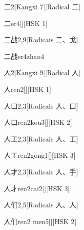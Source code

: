 \begin{entry}{二}{2}[Kangxi 7][Radical ⼆]
  \begin{phonetics}{二}{er4}[][HSK 1]
  \end{phonetics}
\end{entry}

\begin{entry}{二战}{2,9}[Radicais ⼆、⼽]
  \begin{phonetics}{二战}{er4zhan4}
  \end{phonetics}
\end{entry}

\begin{entry}{人}{2}[Kangxi 9][Radical ⼈]
  \begin{phonetics}{人}{ren2}[][HSK 1]
  \end{phonetics}
\end{entry}

\begin{entry}{人口}{2,3}[Radicais ⼈、⼝]
  \begin{phonetics}{人口}{ren2kou3}[][HSK 2]
  \end{phonetics}
\end{entry}

\begin{entry}{人工}{2,3}[Radicais ⼈、⼯]
  \begin{phonetics}{人工}{ren2gong1}[][HSK 3]
  \end{phonetics}
\end{entry}

\begin{entry}{人才}{2,3}[Radicais ⼈、⼿]
  \begin{phonetics}{人才}{ren2cai2}[][HSK 3]
  \end{phonetics}
\end{entry}

\begin{entry}{人们}{2,5}[Radicais ⼈、⼈]
  \begin{phonetics}{人们}{ren2 men5}[][HSK 2]
  \end{phonetics}
\end{entry}

